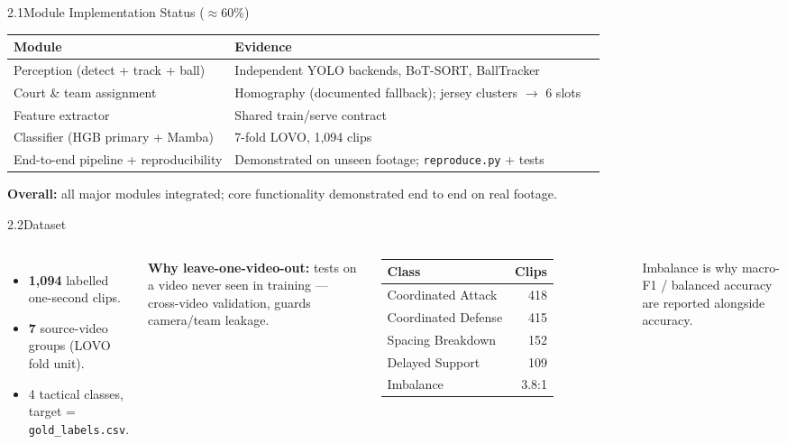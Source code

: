 \documentclass[aspectratio=169, 11pt]{beamer}
\newcommand{\integ}{\textcolor{okGreen}{\textbf{\checkmark}}}
\begin{document}
\begin{frame}[t]{2.1\quad Module Implementation Status ($\approx$60\%)}
    \scriptsize
    \begin{tabular}{@{}p{5.2cm}p{6.0cm}c@{}}
        \toprule
        \textbf{Module} & \textbf{Evidence} & \\
        \midrule
        Perception (detect + track + ball)  & Independent YOLO backends, BoT-SORT, BallTracker & \integ \\
        Court \& team assignment            & Homography (documented fallback); jersey clusters $\rightarrow$ 6 slots & \integ \\
        Feature extractor                   & Shared train/serve contract & \integ \\
        Classifier (HGB primary + Mamba)    & 7-fold LOVO, 1{,}094 clips & \integ \\
        End-to-end pipeline + reproducibility & Demonstrated on unseen footage; \texttt{reproduce.py} + tests & \integ \\
        \bottomrule
    \end{tabular}
    \vspace{0.2cm}\footnotesize
    \textbf{Overall:} all major modules integrated; core functionality
    demonstrated end to end on real footage.
\end{frame}

\begin{frame}[t]{2.2\quad Dataset}
    \small
    \begin{columns}[t]
        \begin{itemize}
            \item \textbf{1{,}094} labelled one-second clips.
            \item \textbf{7} source-video groups (LOVO fold unit).
            \item 4 tactical classes, target = \texttt{gold\_labels.csv}.
        \end{itemize}
        \vspace{0.2cm}
        \textbf{Why leave-one-video-out:} tests on a video never seen in
        training --- cross-video validation, guards camera/team leakage.
        \begin{tabular}{@{}lr@{}}
            \toprule Class & Clips \\ \midrule
            Coordinated Attack   & 418 \\
            Coordinated Defense  & 415 \\
            Spacing Breakdown    & 152 \\
            Delayed Support      & 109 \\
            \midrule Imbalance & 3.8:1 \\
            \bottomrule
        \end{tabular}
        \vspace{0.15cm}\footnotesize
        Imbalance is why macro-F1 / balanced accuracy are reported
        alongside accuracy.
    \end{columns}
\end{frame}
\end{document}

